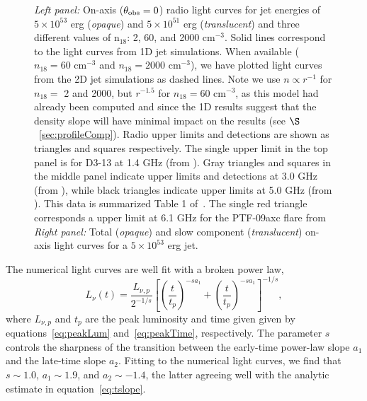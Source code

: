 \documentclass[usenatbib,fleqn]{mnras}
\begin{document}
\begin{figure}
  \caption{\label{fig:lightcurves} \textit{Left panel:} On-axis
    ($\theta_{\rm obs}=0$) radio light curves for jet energies of
    $5\times 10^{53}$ erg ({\it opaque}) and $5\times 10^{51}$ erg
    ({\it translucent}) and three different values of n$_{18}$: 2, 60,
    and 2000 cm$^{-3}$.  Solid lines correspond to the light curves
    from 1D jet simulations. When available ($n_{18}=60$ cm$^{-3}$ and
    $n_{18}=2000$ cm$^{-3}$), we have plotted light curves from the 2D
    jet simulations as dashed lines. Note we use $n\propto r^{-1}$ for
    $n_{18}=$ 2 and 2000, but $r^{-1.5}$ for $n_{18}=60$ cm$^{-3}$, as
    this model had already been computed and since the 1D results
    suggest that the density slope will have minimal impact on the
    results (see $\S$~\ref{sec:profileComp}).  Radio upper limits and
    detections are shown as triangles and squares respectively. The
    single upper limit in the top panel is for D3-13 at 1.4 GHz (from
    \citet{Bower+2011}). Gray triangles and squares in the middle
    panel indicate upper limits and detections at 3.0 GHz (from
    \citealt{Bower+2013}), while black triangles indicate upper limits
    at 5.0 GHz (from \citealt{van-Velzen+2013}).  This data is
    summarized Table 1 of~\citealt{Mimica+2015}. The single red
    triangle corresponds a upper limit at 6.1 GHz for the PTF-09axc
    flare from \citet{Arcavi+2014} \textit{Right panel:} Total
    ({\it opaque}) and slow component ({\it translucent}) on-axis
    light curves for a $5\times 10^{53}$ erg jet.}
\end{figure}

The numerical light curves are well fit with a broken power law,
\begin{equation}
L_\nu (t) =\frac{L_{\nu, p}}{2^{-1/s}}
\left[\left(\frac{t}{t_p}\right)^{-s
    a_1}+\left(\frac{t}{t_p}\right)^{-s a_1}\right]^{-1/s}, 
\label{eq:lcAnal}
\end{equation}
where $L_{\nu, p}$ and $t_p$ are the peak luminosity and time given given by equations~\eqref{eq:peakLum}
and~\eqref{eq:peakTime}, respectively.  The parameter $s$ controls the sharpness of the transition between the early-time power-law slope $a_1$ and the late-time slope $a_2$.  Fitting to the numerical light curves, we find that $s\sim 1.0$, $a_1\sim 1.9$, and $a_2\sim -1.4$, the latter agreeing well with the analytic estimate in equation~\eqref{eq:tslope}.
\end{document}
